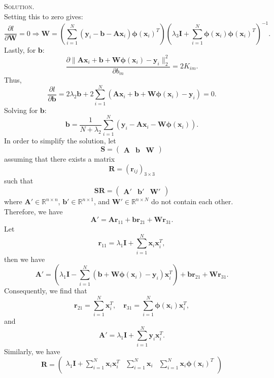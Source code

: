 \documentclass[12pt, a4paper, oneside]{ctexart}
\newenvironment{solution}{\par\noindent\textsc{Solution. }}{\\\par}
\begin{document}
\begin{solution}
\[	\]
	Setting this to zero gives:
	\[
	\frac{\partial l}{\partial \mathbf{W}} = 0 \Rightarrow \mathbf{W} = \left(\sum_{i = 1}^{N}(\mathbf{y}_i - \mathbf{b} - \mathbf{A}\mathbf{x}_i) \boldsymbol{\phi}(\mathbf{x}_i)^T\right) \left(\lambda_3 \mathbf{I} + \sum_{i = 1}^{N} \boldsymbol{\phi}(\mathbf{x}_i) \boldsymbol{\phi}(\mathbf{x}_i)^T\right)^{-1}.
	\]
	Lastly, for \(\mathbf{b}\):
	\[
	\frac{\partial \|\mathbf{A}\mathbf{x}_i + \mathbf{b} + \mathbf{W} \boldsymbol{\phi}(\mathbf{x}_i) - \mathbf{y}_i\|^2_2}{\partial b_m} = 2K_{im}.
	\]
	Thus,
	\[
	\frac{\partial l}{\partial \mathbf{b}} = 2\lambda_2 \mathbf{b} + 2\sum_{i = 1}^{N}(\mathbf{A}\mathbf{x}_i + \mathbf{b} + \mathbf{W} \boldsymbol{\phi}(\mathbf{x}_i) - \mathbf{y}_i) = 0.
	\]
	Solving for \(\mathbf{b}\):
	\[
	\mathbf{b} = \frac{1}{N + \lambda_2} \sum_{i = 1}^{N}(\mathbf{y}_i - \mathbf{A}\mathbf{x}_i - \mathbf{W} \boldsymbol{\phi}(\mathbf{x}_i)).
	\]
	In order to simplify the solution, let 
	\[
	\mathbf{S} = \begin{pmatrix}
	\mathbf{A} & \mathbf{b} & \mathbf{W}
	\end{pmatrix}
	\]
	assuming that there exists a matrix 
	\[
	\mathbf{R} = (\mathbf{r}_{ij})_{3 \times 3}
	\]
	such that 
	\[
	\mathbf{S}\mathbf{R} = \begin{pmatrix}
	\mathbf{A}' & \mathbf{b}' & \mathbf{W}'
	\end{pmatrix}
	\]
	where \(\mathbf{A}' \in \mathbb{R}^{n \times n}\), \(\mathbf{b}' \in \mathbb{R}^{n \times 1}\), and \(\mathbf{W}' \in \mathbb{R}^{n \times N}\) do not contain each other. 
	Therefore, we have 
	\[
	\mathbf{A}' = \mathbf{A}\mathbf{r}_{11} + \mathbf{b}\mathbf{r}_{21} + \mathbf{W}\mathbf{r}_{31}.
	\]
	Let 
	\[
	\mathbf{r}_{11} = \lambda_1 \mathbf{I} + \sum_{i=1}^{N}\mathbf{x}_i \mathbf{x}_i^T,
	\]
	then we have 
	\[
	\mathbf{A}' = \left(\lambda_1 \mathbf{I} - \sum_{i=1}^{N}(\mathbf{b} + \mathbf{W} \boldsymbol{\phi}(\mathbf{x}_i) - \mathbf{y}_i)\mathbf{x}_i^T\right) + \mathbf{b}\mathbf{r}_{21} + \mathbf{W}\mathbf{r}_{31}.
	\]
	Consequently, we find that 
	\[
	\mathbf{r}_{21} = \sum_{i=1}^{N}\mathbf{x}_i^T, \quad \mathbf{r}_{31} = \sum_{i=1}^{N}\boldsymbol{\phi}(\mathbf{x}_i)\mathbf{x}_i^T,
	\]
	and 
	\[
	\mathbf{A}' = \lambda_1 \mathbf{I} + \sum_{i=1}^{N}\mathbf{y}_i\mathbf{x}_i^T.
	\]
	Similarly, we have 
	\[
	\mathbf{R} = \begin{pmatrix}
	\lambda_1 \mathbf{I} + \sum_{i=1}^{N}\mathbf{x}_i \mathbf{x}_i^T & \sum_{i=1}^{N}\mathbf{x}_i & \sum_{i=1}^{N}\mathbf{x}_i\boldsymbol{\phi}(\mathbf{x}_i)^T \\

\end{pmatrix}\]
\end{solution}
\end{document}
